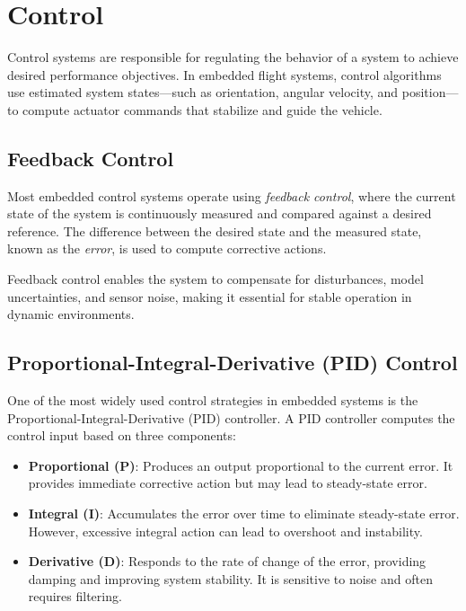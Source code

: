 \section{Control}
\label{sec:control}

Control systems are responsible for regulating the behavior of a system to achieve desired performance objectives. In embedded flight systems, control algorithms use estimated system states—such as orientation, angular velocity, and position—to compute actuator commands that stabilize and guide the vehicle.

\subsection{Feedback Control}

Most embedded control systems operate using \textit{feedback control}, where the current state of the system is continuously measured and compared against a desired reference. The difference between the desired state and the measured state, known as the \textit{error}, is used to compute corrective actions.

Feedback control enables the system to compensate for disturbances, model uncertainties, and sensor noise, making it essential for stable operation in dynamic environments.

\subsection{Proportional-Integral-Derivative (PID) Control}

One of the most widely used control strategies in embedded systems is the Proportional-Integral-Derivative (PID) controller. A PID controller computes the control input based on three components:

\begin{itemize}
    \item \textbf{Proportional (P)}:  
    Produces an output proportional to the current error. It provides immediate corrective action but may lead to steady-state error.

    \item \textbf{Integral (I)}:  
    Accumulates the error over time to eliminate steady-state error. However, excessive integral action can lead to overshoot and instability.

    \item \textbf{Derivative (D)}:  
    Responds to the rate of change of the error, providing damping and improving system stability. It is sensitive to noise and often requires filtering.
\end{itemize}

